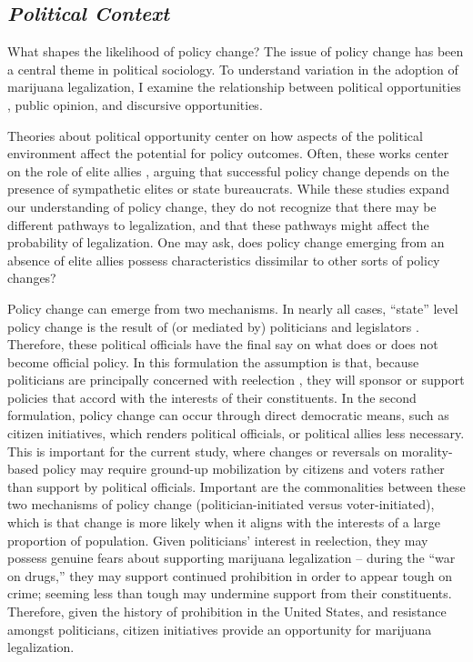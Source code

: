 \subsection{\it{Political Context}}

What shapes the likelihood of policy change? The issue of policy change has been a central theme in political sociology. To understand variation in the adoption of marijuana legalization, I examine the relationship between political opportunities%
, public opinion, and discursive opportunities.


Theories about political opportunity center on how aspects of the political environment affect the potential for policy outcomes. Often, these works center on the role of elite allies \citep{amenta_et_al_1994,amenta_2006}, arguing that successful policy change depends on the presence of sympathetic elites or state bureaucrats. While these studies expand our understanding of policy change, they do not recognize that there may be different pathways to legalization, and that these pathways might affect the probability of legalization. One may ask, does policy change emerging from an absence of elite allies possess characteristics dissimilar to other sorts of policy changes? 




Policy change can emerge from two mechanisms. In nearly all cases, ``state'' level policy change is the result of (or mediated by) politicians and legislators \citep{amenta_et_al_1994,amenta_2006}. Therefore, these political officials have the final say on what does or does not become official policy. In this formulation the assumption is that, because politicians are principally concerned with reelection \citep{page_and_shapiro_1983,mayhew_1974,downs_1957,stimson_et_al_1995}, they will sponsor or support policies that accord with the interests of their constituents. In the second formulation, policy change can occur through direct democratic means, such as citizen initiatives, which renders political officials, or political allies less necessary. This is important for the current study, where changes or reversals on morality-based policy may require ground-up mobilization by citizens and voters rather than support by political officials. Important are the commonalities between these two mechanisms of policy change (politician-initiated versus voter-initiated), which is that change is more likely when it aligns with the interests of a large proportion of population. Given politicians' interest in reelection, they may possess genuine fears about supporting marijuana legalization -- during the ``war on drugs,'' they may support continued prohibition in order to appear tough on crime; seeming less than tough may undermine support from their constituents. Therefore, given the history of prohibition in the United States, and resistance amongst politicians, citizen initiatives provide an opportunity for marijuana legalization. 



